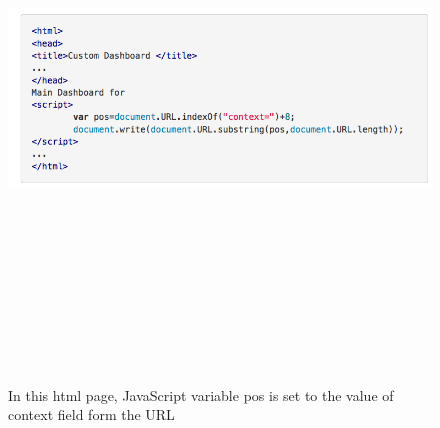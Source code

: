 \begin{figure}[htb]
\centering
\includegraphics[width=15cm,height=15cm,keepaspectratio]{image/dxss.png}
\caption[DOM based cross-site scripting attack]{In this html page, JavaScript variable pos is set to the value of context field form the URL ~\cite{g20}} 
\label{fig:dxss}
\end{figure}

